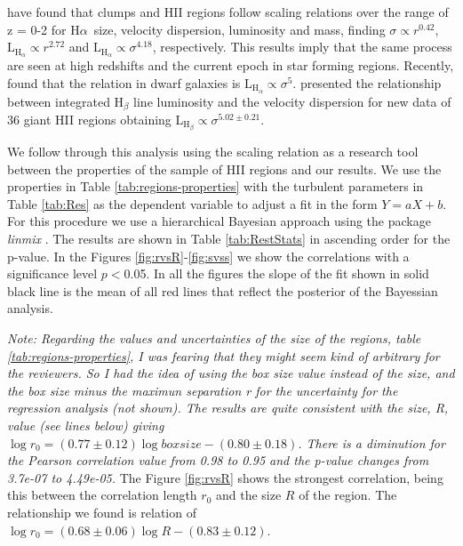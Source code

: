 \documentclass[fleqn,usenatbib, useAMS, a4paper]{mnras}
\newcommand\halpha{H${\alpha}$}
\begin{document}
\citet{2012MNRAS.422.3339W} have found that clumps and HII regions follow scaling relations over the range of z = 0-2 for \halpha\ size, velocity dispersion, luminosity and mass, finding \(\sigma \propto r^{0.42}\), \(\text{L}_{\text{H}_{\alpha}} \propto r^{2.72}\) and \(\text{L}_{\text{H}_{\alpha}} \propto \sigma^{4.18}\), respectively. 
This results imply that the same process are seen at high redshifts and the current epoch in star forming regions.
Recently, \citet{Moiseev:2015a} found that the relation in dwarf galaxies is \(\text{L}_{\text{H}_{\alpha}} \propto \sigma^{5}\).
\citet{2018MNRAS.474.1250F} presented the relationship between integrated H$_{\beta}$ line luminosity and the velocity dispersion for new data of 36 giant HII regions obtaining \(\text{L}_{\text{H}_{\beta}} \propto \sigma^{5.02 \pm 0.21}\).

We follow through this analysis using the scaling relation as a research tool between the properties of the sample of HII regions and our results. 
We use the properties in Table \ref{tab:regions-properties} with the turbulent parameters in Table \ref{tab:Res} as the dependent variable to adjust a fit in the form $Y = aX +b$. 
For this procedure we use a hierarchical Bayesian approach using the package \textit{linmix} \citep{2007ApJ...665.1489K}.
The results are shown in Table \ref{tab:RestStats} in ascending order for the p-value.
In the Figures \ref{fig:rvsR}-\ref{fig:svss} we show the correlations with a significance level  $p < $0.05.
In all the figures the slope of the fit shown in solid black line is the mean of all red lines that reflect the posterior of the Bayessian analysis.

\textit{Note: Regarding the values and uncertainties of the size of the regions, table \ref{tab:regions-properties},  I was fearing that they might seem kind of arbitrary for the reviewers. So I had the idea of using the box size value instead of the size, and the box size minus the maximun separation r for the uncertainty for the regression analysis (not shown). The results are quite consistent with the size, R, value (see lines below) giving $\log r_0 = (0.77 \pm 0.12) \log box size-(0.80 \pm 0.18)$. There is a diminution for the Pearson correlation value from 0.98 to 0.95 and the p-value changes from 3.7e-07 to 4.49e-05.}
The Figure \ref{fig:rvsR} shows the strongest correlation, being this between the correlation length $r_0$ and the size $R$ of the region. The relationship we found is relation of \(\log r_0 = (0.68 \pm 0.06) \log R-(0.83 \pm 0.12)\).
\end{document}
